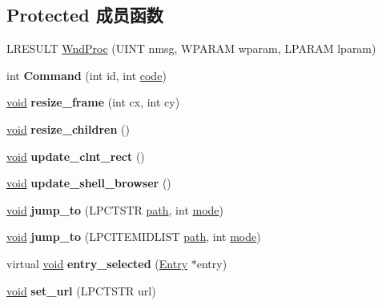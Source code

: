 \subsection*{Protected 成员函数}
\begin{DoxyCompactItemize}
\item 
L\+R\+E\+S\+U\+LT \hyperlink{struct_s_d_i_main_frame_ad46e76e9bcc00352bba90e9eb5cdf5a2}{Wnd\+Proc} (U\+I\+NT nmsg, W\+P\+A\+R\+AM wparam, L\+P\+A\+R\+AM lparam)
\item 
\mbox{\label{struct_s_d_i_main_frame_abc267b3f17693d8146a51a69c9738e19}} 
int {\bfseries Command} (int id, int \hyperlink{structcode}{code})
\item 
\mbox{\label{struct_s_d_i_main_frame_ab49b711743dee7652485ea55a1ba291d}} 
\hyperlink{interfacevoid}{void} {\bfseries resize\+\_\+frame} (int cx, int cy)
\item 
\mbox{\label{struct_s_d_i_main_frame_a68d8fa304f899b4c6453414197cf8090}} 
\hyperlink{interfacevoid}{void} {\bfseries resize\+\_\+children} ()
\item 
\mbox{\label{struct_s_d_i_main_frame_a832bca511b31b651ec09ada7acca3ffe}} 
\hyperlink{interfacevoid}{void} {\bfseries update\+\_\+clnt\+\_\+rect} ()
\item 
\mbox{\label{struct_s_d_i_main_frame_a690452799aa00264bb26893b5aa74084}} 
\hyperlink{interfacevoid}{void} {\bfseries update\+\_\+shell\+\_\+browser} ()
\item 
\mbox{\label{struct_s_d_i_main_frame_a231f2c83c8f709eba714ef7904cd663a}} 
\hyperlink{interfacevoid}{void} {\bfseries jump\+\_\+to} (L\+P\+C\+T\+S\+TR \hyperlink{structpath}{path}, int \hyperlink{interfacevoid}{mode})
\item 
\mbox{\label{struct_s_d_i_main_frame_a7fd31ba31d17622bdf9277acb589d5ea}} 
\hyperlink{interfacevoid}{void} {\bfseries jump\+\_\+to} (L\+P\+C\+I\+T\+E\+M\+I\+D\+L\+I\+ST \hyperlink{structpath}{path}, int \hyperlink{interfacevoid}{mode})
\item 
\mbox{\label{struct_s_d_i_main_frame_a3001d8006f76fa6111a9f0f468ae59f5}} 
virtual \hyperlink{interfacevoid}{void} {\bfseries entry\+\_\+selected} (\hyperlink{struct_entry}{Entry} $\ast$entry)
\item 
\mbox{\label{struct_s_d_i_main_frame_a77e47a2c416e403093a89f1e609c5629}} 
\hyperlink{interfacevoid}{void} {\bfseries set\+\_\+url} (L\+P\+C\+T\+S\+TR url)
\end{DoxyCompactItemize}
